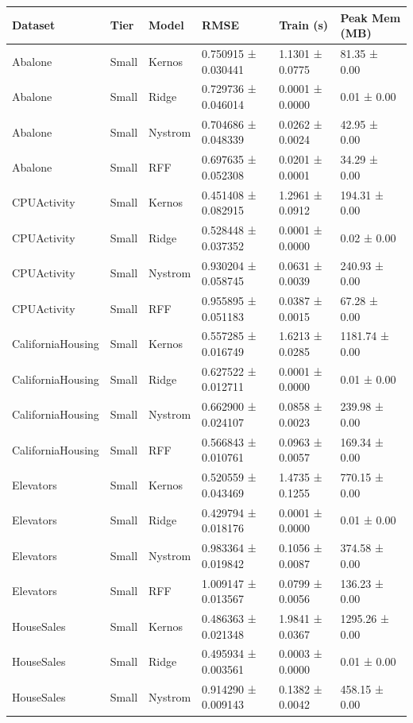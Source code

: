 \begin{table}[ht]
\centering
\small
\begin{tabular}{llllll}
\toprule
Dataset & Tier & Model & RMSE & Train (s) & Peak Mem (MB) \\
\midrule
Abalone & Small & Kernos & 0.750915 ± 0.030441 & 1.1301 ± 0.0775 & 81.35 ± 0.00 \\
Abalone & Small & Ridge & 0.729736 ± 0.046014 & 0.0001 ± 0.0000 & 0.01 ± 0.00 \\
Abalone & Small & Nystrom & 0.704686 ± 0.048339 & 0.0262 ± 0.0024 & 42.95 ± 0.00 \\
Abalone & Small & RFF & 0.697635 ± 0.052308 & 0.0201 ± 0.0001 & 34.29 ± 0.00 \\
\midrule
CPUActivity & Small & Kernos & 0.451408 ± 0.082915 & 1.2961 ± 0.0912 & 194.31 ± 0.00 \\
CPUActivity & Small & Ridge & 0.528448 ± 0.037352 & 0.0001 ± 0.0000 & 0.02 ± 0.00 \\
CPUActivity & Small & Nystrom & 0.930204 ± 0.058745 & 0.0631 ± 0.0039 & 240.93 ± 0.00 \\
CPUActivity & Small & RFF & 0.955895 ± 0.051183 & 0.0387 ± 0.0015 & 67.28 ± 0.00 \\
\midrule
CaliforniaHousing & Small & Kernos & 0.557285 ± 0.016749 & 1.6213 ± 0.0285 & 1181.74 ± 0.00 \\
CaliforniaHousing & Small & Ridge & 0.627522 ± 0.012711 & 0.0001 ± 0.0000 & 0.01 ± 0.00 \\
CaliforniaHousing & Small & Nystrom & 0.662900 ± 0.024107 & 0.0858 ± 0.0023 & 239.98 ± 0.00 \\
CaliforniaHousing & Small & RFF & 0.566843 ± 0.010761 & 0.0963 ± 0.0057 & 169.34 ± 0.00 \\
\midrule
Elevators & Small & Kernos & 0.520559 ± 0.043469 & 1.4735 ± 0.1255 & 770.15 ± 0.00 \\
Elevators & Small & Ridge & 0.429794 ± 0.018176 & 0.0001 ± 0.0000 & 0.01 ± 0.00 \\
Elevators & Small & Nystrom & 0.983364 ± 0.019842 & 0.1056 ± 0.0087 & 374.58 ± 0.00 \\
Elevators & Small & RFF & 1.009147 ± 0.013567 & 0.0799 ± 0.0056 & 136.23 ± 0.00 \\
\midrule
HouseSales & Small & Kernos & 0.486363 ± 0.021348 & 1.9841 ± 0.0367 & 1295.26 ± 0.00 \\
HouseSales & Small & Ridge & 0.495934 ± 0.003561 & 0.0003 ± 0.0000 & 0.01 ± 0.00 \\
HouseSales & Small & Nystrom & 0.914290 ± 0.009143 & 0.1382 ± 0.0042 & 458.15 ± 0.00 \\

\end{tabular}
\end{table}

